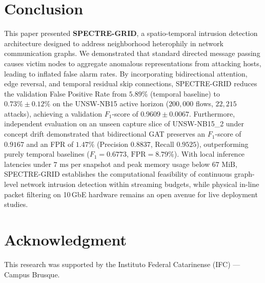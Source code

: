 \documentclass[conference]{IEEEtran}
\begin{document}
\section{Conclusion}

This paper presented \textbf{SPECTRE-GRID}, a spatio-temporal intrusion detection architecture designed to address neighborhood heterophily in network communication graphs. We demonstrated that standard directed message passing causes victim nodes to aggregate anomalous representations from attacking hosts, leading to inflated false alarm rates. By incorporating bidirectional attention, edge reversal, and temporal residual skip connections, SPECTRE-GRID reduces the validation False Positive Rate from $5.89\%$ (temporal baseline) to $0.73\% \pm 0.12\%$ on the UNSW-NB15 active horizon ($200{,}000$ flows, $22{,}215$ attacks), achieving a validation $F_1$-score of $0.9609 \pm 0.0067$. Furthermore, independent evaluation on an unseen capture slice of UNSW-NB15\_2 under concept drift demonstrated that bidirectional GAT preserves an $F_1$-score of $0.9167$ and an FPR of $1.47\%$ (Precision $0.8837$, Recall $0.9525$), outperforming purely temporal baselines ($F_1 = 0.6773$, $\text{FPR} = 8.79\%$). With local inference latencies under $7\text{ ms}$ per snapshot and peak memory usage below $67\text{ MiB}$, SPECTRE-GRID establishes the computational feasibility of continuous graph-level network intrusion detection within streaming budgets, while physical in-line packet filtering on 10\,GbE hardware remains an open avenue for live deployment studies.

\section*{Acknowledgment}
This research was supported by the Instituto Federal Catarinense (IFC) --- Campus Brusque.

\balance


\end{document}
